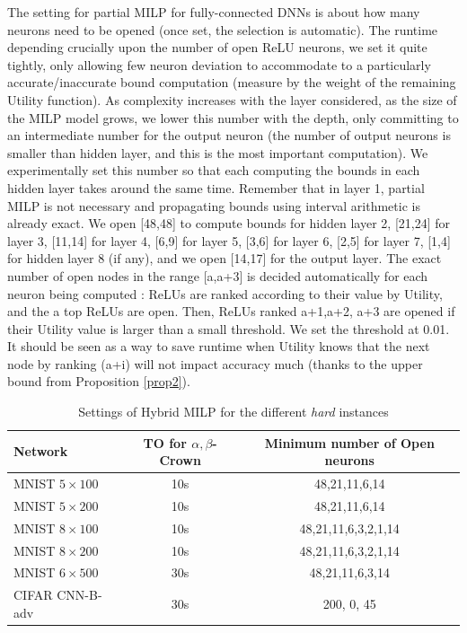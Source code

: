 The setting for partial MILP for fully-connected DNNs is about how many neurons need to be opened (once set, the selection is automatic). The runtime depending crucially upon the number of open ReLU neurons, we set it quite tightly, only allowing few neuron deviation to accommodate to a particularly accurate/inaccurate bound computation (measure by the weight of the remaining Utility function). As complexity increases with the layer considered, as the size of the MILP model grows, we lower this number with the depth, only committing to an intermediate number for the output neuron (the number of output neurons  is smaller than hidden layer, and this is the most important computation). We experimentally set this number so that each computing the bounds in each hidden layer takes around the same time. Remember that in layer 1, partial MILP is not necessary and propagating bounds using interval arithmetic is already exact. We open [48,48] to compute bounds for hidden layer 2, [21,24] for layer 3, [11,14] for layer 4, [6,9] for layer 5, [3,6] for layer 6, [2,5] for layer 7, [1,4] for hidden layer 8 (if any), and we open [14,17] for the output layer.
{\color{blue} The exact number of open nodes in the range [a,a+3] is decided automatically for each neuron being computed : ReLUs are ranked according to their value by Utility, and the a top ReLUs are open. Then, ReLUs ranked a+1,a+2, a+3 are opened if their Utility value is larger than a small threshold. We set the threshold at 0.01. It should be seen as a way to save runtime when Utility knows that the next node by ranking (a+i) will not impact accuracy much (thanks to the upper bound from Proposition \ref{prop2}).}

\begin{table}[b!]
	\centering
	\begin{tabular}{||l||c|c||}
		\hline \hline
		Network & TO for $\alpha,\beta$-Crown  & Minimum number of Open neurons  \\ 		  
		\hline
		MNIST $5 \times 100$ & 10s  & 48,21,11,6,14  \\ \hline
		MNIST $5 \times 200$ & 10s & 48,21,11,6,14  \\ \hline
		MNIST $8 \times 100$ & 10s  & 48,21,11,6,3,2,1,14  \\ \hline
		MNIST $8 \times 200$ & 10s & 48,21,11,6,3,2,1,14  \\ \hline
		MNIST $6 \times 500$ & 30s & 48,21,11,6,3,14 \\ \hline
		CIFAR CNN-B-adv & 30s & 200, 0, 45 \\ \hline \hline
	\end{tabular}
	\caption{Settings of Hybrid MILP for the different {\em hard} instances}
	\label{table20}
	\end{table}



